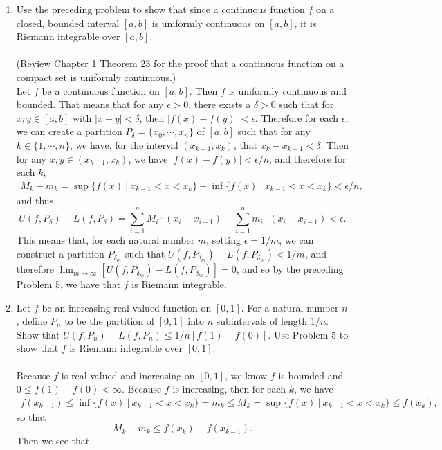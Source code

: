 \begin{enumerate}
    \item Use the preceding problem to show that since a continuous function $f$ on a closed, bounded interval $[a,b]$ is uniformly continuous on $[a,b]$, it is Riemann integrable over $[a,b]$.\\
    \\(Review Chapter 1 Theorem 23 for the proof that a continuous function on a compact set is uniformly continuous.)
    \\Let $f$ be a continuous function on $[a,b]$. Then $f$ is uniformly continuous and bounded.
    That means that for any $\epsilon>0$, there exists a $\delta>0$ such that for $x,y\in[a,b]$ with $|x-y|<\delta$, then $|f(x)-f(y)|<\epsilon$.
    Therefore for each $\epsilon$, we can create a partition $P_\delta=\{x_0,\cdots,x_n\}$ of $[a,b]$ such that for any $k\in\{1,\cdots,n\}$, we have, for the interval $(x_{k-1},x_k)$, that $x_k-x_{k-1}<\delta$.
    Then for any $x,y\in(x_{k-1},x_k)$, we have $|f(x)-f(y)|<\epsilon/n$, and therefore for each $k$,
    \begin{align*}
        M_k-m_k=\sup\{f(x)\ |\ x_{k-1}<x<x_k\}-\inf\{f(x)\ |\ x_{k-1}<x<x_k\}<\epsilon/n,
    \end{align*}
    and thus
    \[
        U(f,P_\delta)-L(f,P_\delta)=\sum_{i=1}^n M_i\cdot (x_i-x_{i-1})-\sum_{i=1}^n m_i\cdot (x_i-x_{i-1})<\epsilon.
    \]
    This means that, for each natural number $m$, setting $\epsilon=1/m$, we can construct a partition $P_{\delta_m}$ such that $U(f,P_{\delta_m})-L(f,P_{\delta_m})<1/m$, and therefore $\lim_{m\to\infty}[U(f,P_{\delta_m})-L(f,P_{\delta_m})]=0$, and so by the preceding Problem 5, we have that $f$ is Riemann integrable.
    \item Let $f$ be an increasing real-valued function on $[0,1]$. For a natural number $n$, define $P_n$ to be the partition of $[0,1]$ into $n$ subintervals of length $1/n$. 
    Show that $U(f,P_n)-L(f,P_n)\le 1/n[f(1)-f(0)]$. Use Problem 5 to show that $f$ is Riemann integrable over $[0,1]$.\\
    \\Because $f$ is real-valued and increasing on $[0,1]$, we know $f$ is bounded and $0\le f(1)-f(0)<\infty$.
    Because $f$ is increasing, then for each $k$, we have
    \begin{align*}
        f(x_{k-1})\le\inf\{f(x)\ |\ x_{k-1}<x<x_k\}=m_k\le M_k=\sup\{f(x)\ |\ x_{k-1}<x<x_k\}\le f(x_k),
    \end{align*}
    so that
    \[
        M_k-m_k\le f(x_k)-f(x_{k-1}).
    \]
    Then we see that
    \begin{align*}

\end{align*}
\end{enumerate}
